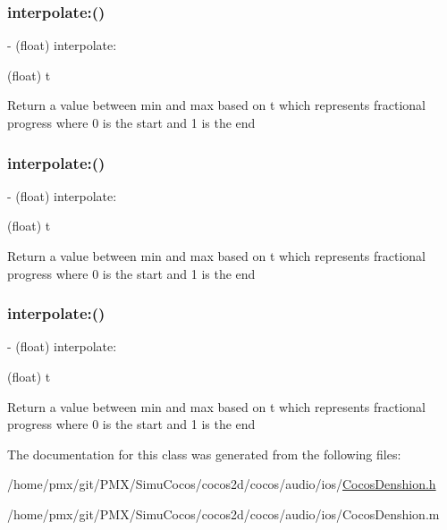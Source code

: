 \subsubsection{\texorpdfstring{interpolate\+:()}{interpolate:()}\hspace{0.1cm}{\footnotesize\ttfamily [2/4]}}
{\footnotesize\ttfamily -\/ (float) interpolate\+: \begin{DoxyParamCaption}\item[{(float)}]{t }\end{DoxyParamCaption}}

Return a value between min and max based on t which represents fractional progress where 0 is the start and 1 is the end \mbox{\label{interfaceCDFloatInterpolator_a0eff31af0006d4602c728fc6fbd7e755}} 
\subsubsection{\texorpdfstring{interpolate\+:()}{interpolate:()}\hspace{0.1cm}{\footnotesize\ttfamily [3/4]}}
{\footnotesize\ttfamily -\/ (float) interpolate\+: \begin{DoxyParamCaption}\item[{(float)}]{t }\end{DoxyParamCaption}}

Return a value between min and max based on t which represents fractional progress where 0 is the start and 1 is the end \mbox{\label{interfaceCDFloatInterpolator_a0eff31af0006d4602c728fc6fbd7e755}} 
\subsubsection{\texorpdfstring{interpolate\+:()}{interpolate:()}\hspace{0.1cm}{\footnotesize\ttfamily [4/4]}}
{\footnotesize\ttfamily -\/ (float) interpolate\+: \begin{DoxyParamCaption}\item[{(float)}]{t }\end{DoxyParamCaption}}

Return a value between min and max based on t which represents fractional progress where 0 is the start and 1 is the end 

The documentation for this class was generated from the following files\+:\begin{DoxyCompactItemize}
\item 
/home/pmx/git/\+P\+M\+X/\+Simu\+Cocos/cocos2d/cocos/audio/ios/\hyperlink{cocos2d_2cocos_2audio_2ios_2CocosDenshion_8h}{Cocos\+Denshion.\+h}\item 
/home/pmx/git/\+P\+M\+X/\+Simu\+Cocos/cocos2d/cocos/audio/ios/Cocos\+Denshion.\+m\end{DoxyCompactItemize}
